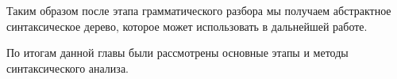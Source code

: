 






Таким образом после этапа грамматического разбора мы получаем абстрактное синтаксическое дерево, которое может использовать в дальнейшей работе.

По итогам данной главы были рассмотрены основные этапы и методы синтаксического анализа.